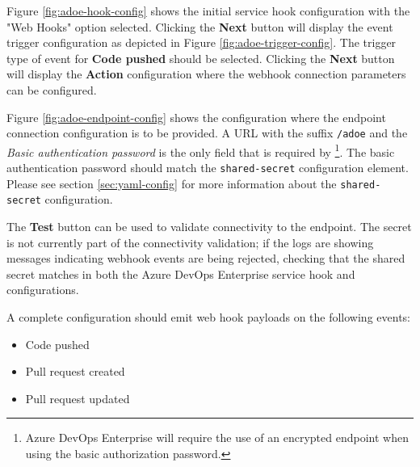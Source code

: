 Figure \ref{fig:adoe-hook-config} shows the initial service hook configuration with the 
"Web Hooks" option selected.  Clicking the \textbf{Next} button will display the 
event trigger configuration as depicted in Figure \ref{fig:adoe-trigger-config}. 
The trigger type of event for \textbf{Code pushed} should be selected.
Clicking the \textbf{Next} button will display the \textbf{Action} configuration
where the webhook connection parameters can be configured.

Figure \ref{fig:adoe-endpoint-config} shows the configuration where the \cxoneflow
endpoint connection configuration is to be provided.  A URL with the suffix
\texttt{/adoe} and the \textit{Basic authentication password} is the only
field that is required by \cxoneflow\footnote{Azure DevOps Enterprise will require
the use of an encrypted endpoint when using the basic authorization password.}.
The basic authentication password should match the \texttt{shared-secret} \cxoneflow
configuration element.  Please see section \ref{sec:yaml-config}
for more information about the \texttt{shared-secret} configuration.

The \textbf{Test} button can be used to validate connectivity to the \cxoneflow endpoint.
The secret is not currently part of the connectivity validation; if the \cxoneflow logs
are showing messages indicating webhook events are being rejected, checking that the
shared secret matches in both the Azure DevOps Enterprise service hook and \cxoneflow
configurations.

A complete configuration should emit web hook payloads on the following events:

\begin{itemize}
    \item Code pushed
    \item Pull request created
    \item Pull request updated
\end{itemize}

